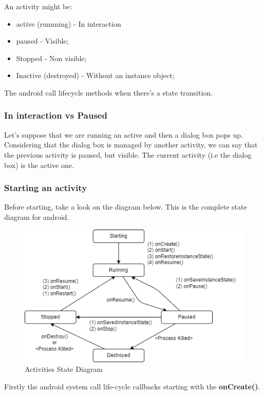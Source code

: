     An activity might be:
    \begin{itemize}
        \item active (runnning) - In interaction
        \item paused - Visible;
        \item Stopped - Non visible;
        \item Inactive (destroyed) - Without an instance object;
    \end{itemize}

    The android call lifecycle methods when there's a state transition.  



\subsubsection{In interaction vs Paused}
Let's suppose that we are running an active and then a dialog box pops up. Considering 
that the dialog box is managed by another activity, we can say that the previous activity is 
paused, but visible. The current activity (i.e the dialog box) is the active one. 

\subsubsection{Starting an activity}   
Before starting, take a look on the diagram below. This is the complete state diagram for android.

\begin{figure}[h]
    \centering
    \includegraphics[width=0.8\linewidth]{figures/02_state_diagram.png}
    \caption{Activities State Diagram}
    \label{fig:state_diagram}
\end{figure}

Firstly the android system call life-cycle callbacks starting with the \textbf{onCreate()}. 

